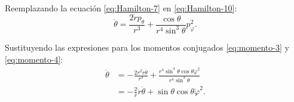 \documentclass[letterpaper,11pt]{article}
\begin{document}
Reemplazando la ecuación \eqref{eq:Hamilton-7} en \eqref{eq:Hamilton-10}:
\begin{equation}
\ddot{\theta} = \frac{2\dot{r} p_{\theta}}{r^3} +  \frac{\cos\theta }{r^4 \sin^3\theta}p_{\varphi}^2 .
\end{equation}

Sustituyendo las expresiones para los momentos conjugados \eqref{eq:momento-3} y \eqref{eq:momento-4}:
\begin{align}
\ddot{\theta} &= - \frac{2 r^2\dot{r} \dot{\theta}}{r^3} +  \frac{r^4\sin^4\theta \cos\theta \dot{\varphi}^2}{r^4 \sin^3\theta} \nonumber  \\
&= - \frac{2}{r} \dot{r}\dot{\theta} +  \sin\theta\cos\theta \dot{\varphi}^2.
\end{align}
\end{document}
